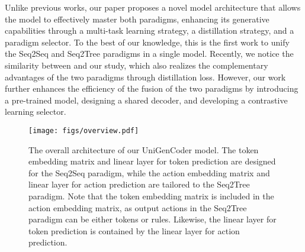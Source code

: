 Unlike previous works, our paper proposes a novel model architecture that allows the model to effectively master both paradigms, enhancing its generative capabilities through a multi-task learning strategy, a distillation strategy, and a paradigm selector. To the best of our knowledge, this is the first work to unify the Seq2Seq and Seq2Tree paradigms in a single model.
Recently, we notice the similarity between \cite{10.1145/3609437.3609465} and our study, which also realizes the complementary advantages of the two paradigms through distillation loss. However, our work further enhances the efficiency of the fusion of the two paradigms by introducing a pre-trained model, designing a shared decoder, and developing a contrastive learning selector.



\begin{figure}[t]
\centering
\footnotesize
\texttt{[image: figs/overview.pdf]}
\setlength{\abovecaptionskip}{0pt}
\caption{The overall architecture of our UniGenCoder model. The token embedding matrix and linear layer for token prediction are designed for the Seq2Seq paradigm, while the action embedding matrix and linear layer for action prediction are tailored to the Seq2Tree paradigm. Note that the token embedding matrix is included in the action embedding matrix, as output actions in the Seq2Tree paradigm can be either tokens or rules. Likewise, the linear layer for token prediction is contained by the linear layer for action prediction.} %
\label{fig:overview}
\vspace{-0.4cm}
\end{figure}